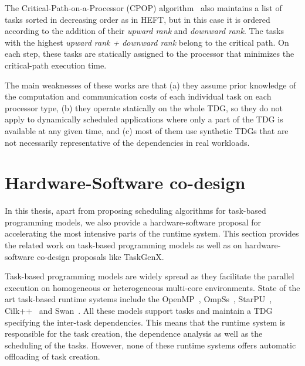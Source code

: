 The Critical-Path-on-a-Processor (CPOP) algorithm~\cite{HEFT} also maintains a list of tasks sorted in decreasing order as in HEFT, but in this case it is ordered according to the addition of their \textit{upward rank} and \textit{downward rank}. The tasks with the highest \textit{upward rank + downward rank} belong to the critical path. On each step, these tasks are statically assigned to the processor that minimizes the critical-path execution time.


The main weaknesses of these works are that (a) they assume prior knowledge of the computation and communication costs of each individual task on each processor type, (b) they operate statically on the whole TDG, so they do not apply to dynamically scheduled applications where only a part of the TDG is available at any given time, and (c) most of them use synthetic TDGs that are not necessarily representative of the dependencies in real workloads.




\section{Hardware-Software co-design}
\label{sec.related.taskgenx}


In this thesis, apart from proposing scheduling algorithms for task-based programming models, we also provide a hardware-software proposal for accelerating the most intensive parts of the runtime system.
This section provides the related work on task-based programming models as well as on hardware-software co-design proposals like TaskGenX.

Task-based programming models are widely spread as they facilitate the parallel execution on homogeneous or heterogeneous multi-core environments.
State of the art task-based runtime systems include the OpenMP~\cite{OpenMP}, OmpSs~\cite{OmpSs_PPL11}, StarPU~\cite{starpu}, Cilk++~\cite{Cilk,Cilk++} and Swan~\cite{Vandierendonck:PACT2011}.
All these models support tasks and maintain a TDG specifying the inter-task dependencies.
This means that the runtime system is responsible for the task creation, the dependence analysis as well as the scheduling of the tasks.
However, none of these runtime systems offers automatic offloading of task creation.

